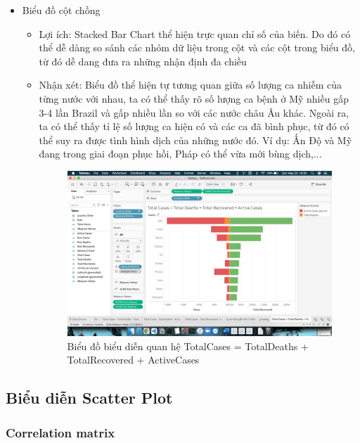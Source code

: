 \documentclass[a4paper, 12pt]{article}
\begin{document}
\begin{itemize}
    \item Biểu đồ cột chồng
    \begin{itemize}
        \item Lợi ích: Stacked Bar Chart thể hiện trực quan chỉ số của biến. Do đó có thể dễ dàng so sánh các nhóm dữ liệu trong cột và các cột trong biểu đồ, từ đó dễ dang đưa ra những nhận định đa chiều
        \item Nhận xét: Biểu đồ thể hiện tự tương quan giữa số lượng ca nhiễm của từng nước với nhau, ta có thể thấy rõ số lượng ca bệnh ở Mỹ nhiều gấp 3-4 lần Brazil và gấp nhiều lần so với các nước châu Âu khác. Ngoài ra, ta có thể thấy tỉ lệ số lượng ca hiện có và các ca đã bình phục, từ đó có thể suy ra được tình hình dịch của những nước đó. Ví dụ: Ấn Độ và Mỹ đang trong giai đoạn phục hồi, Pháp có thể vừa mới bùng dịch,...
        \begin{figure}[H]
            \begin{center}
                \includegraphics[scale=0.4]{img/stackedBar.png}
                \caption{Biểu đồ biểu diễn quan hệ TotalCases = TotalDeaths + TotalRecovered + ActiveCases}
            \end{center}
        \end{figure}
    \end{itemize}
\end{itemize}

\subsection{Biểu diễn Scatter Plot}

\subsubsection{Correlation matrix}
\end{document}
